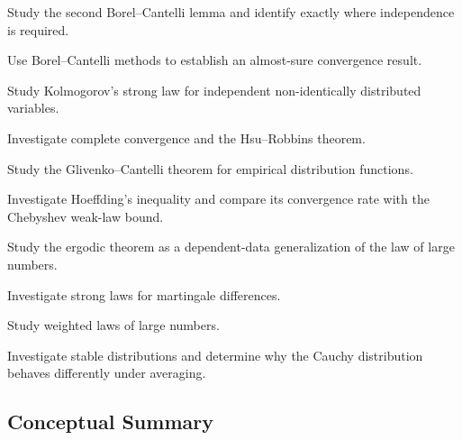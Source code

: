 \begin{exercise}[4]
Study the second Borel--Cantelli lemma and identify exactly where
independence is required.
\end{exercise}

\begin{exercise}[4]
Use Borel--Cantelli methods to establish an almost-sure convergence
result.
\end{exercise}

\begin{exercise}[4]
Study Kolmogorov's strong law for independent non-identically
distributed variables.
\end{exercise}

\begin{exercise}[4]
Investigate complete convergence and the Hsu--Robbins theorem.
\end{exercise}

\begin{exercise}[4]
Study the Glivenko--Cantelli theorem for empirical distribution
functions.
\end{exercise}

\begin{exercise}[4]
Investigate Hoeffding's inequality and compare its convergence rate with
the Chebyshev weak-law bound.
\end{exercise}

\begin{exercise}[4]
Study the ergodic theorem as a dependent-data generalization of the law
of large numbers.
\end{exercise}

\begin{exercise}[4]
Investigate strong laws for martingale differences.
\end{exercise}

\begin{exercise}[4]
Study weighted laws of large numbers.
\end{exercise}

\begin{exercise}[4]
Investigate stable distributions and determine why the Cauchy
distribution behaves differently under averaging.
\end{exercise}

\subsection{Conceptual Summary}
\label{subsec:lln-summary}

